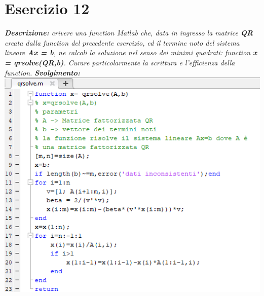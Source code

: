 \section{Esercizio 12}
\textit{\textbf{Descrizione:} crivere una function Matlab che, data in ingresso la matrice \textbf{QR} creata dalla function del precedente esercizio, ed il termine noto del sistema lineare \textbf{Ax = b}, ne calcoli la soluzione nel senso dei minimi quadrati: function \textbf{x = qrsolve(QR,b)}. Curare particolarmente la scrittura e l'efficienza della function.}\newline
\noindent \textit{\textbf{Svolgimento:}}\newline
\includegraphics[width=1.3\linewidth]{img/qrsolve.png}\newpage